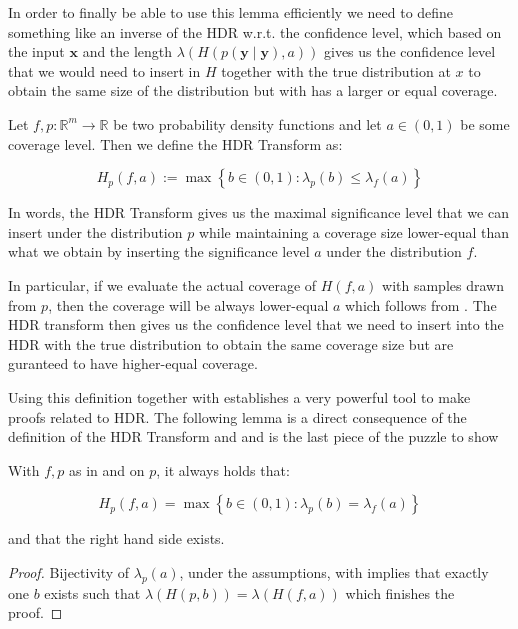 In order to finally be able to use this lemma efficiently we need to define something like an inverse of the HDR w.r.t. the confidence level, which based on the input $\mathbf{x}$ and the length $\lambda(H(p(\mathbf{y} \mid \mathbf{y}), a))$ gives us the confidence level that we would need to insert in $H$ together with the true distribution at $x$ to obtain the same size of the distribution but with  has a larger or equal coverage.

\begin{definition}\label{def:hdr_transform}
    Let $f,p : \mathbb{R}^m \to \mathbb{R}$ be two probability density functions and let $a \in (0,1)$ be some coverage level. Then we define the HDR Transform as:

    \begin{equation}
        H_p(f, a) := \max \left\{b \in (0,1):  \lambda_p(b) \leq \lambda_f(a)\right\}
    \end{equation}

\end{definition}
In words, the HDR Transform gives us the maximal significance level that we can insert under the distribution $p$ while maintaining a coverage size lower-equal than what we obtain by inserting the significance level $a$ under the distribution $f$.

In particular, if we evaluate the actual coverage of $H(f, a)$ with samples drawn from $p$, then the coverage will be always lower-equal $a$ which follows from . The HDR transform then gives us the confidence level that we need to insert into the HDR with the true distribution to obtain the same coverage size but are guranteed to have higher-equal coverage.

Using this definition together with  establishes a very powerful tool to make proofs related to HDR. The following lemma is a direct consequence of the definition of the HDR Transform and  and is the last piece of the puzzle to show 

\begin{lemma}\label{lem:hdr_optimality}
    With $f,p$ as in  and  on $p$, it always holds that:

    \begin{equation}
        H_p(f, a) = \max \left\{b \in (0,1): \lambda_p(b) = \lambda_f(a)\right\}
    \end{equation}

    and that the right hand side exists.
\end{lemma}
\begin{proof}
    Bijectivity of $\lambda_p(a)$, under the assumptions, with  implies that exactly one $b$ exists such that $\lambda(H(p, b)) = \lambda(H(f, a))$ which finishes the proof.
\end{proof}

